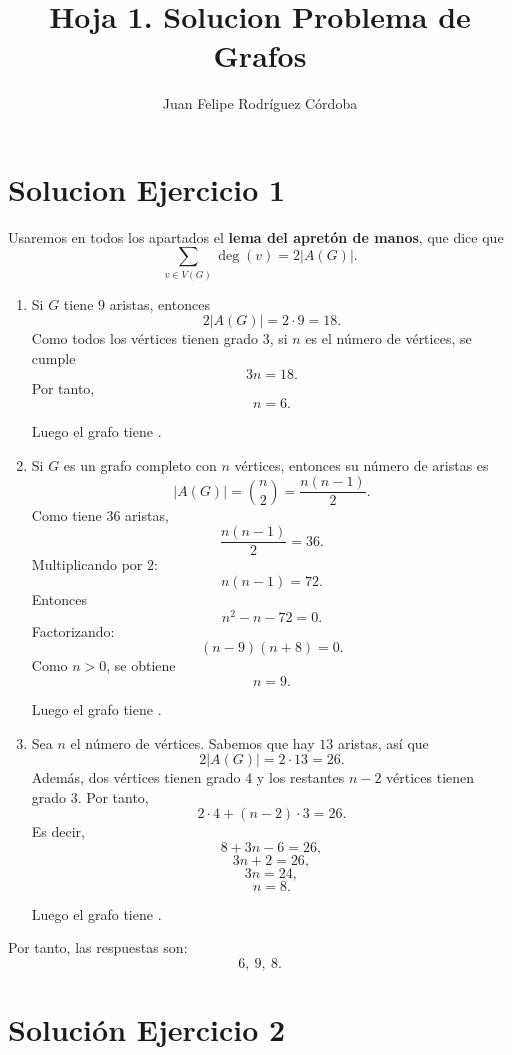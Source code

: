 \documentclass[12pt]{article}
\title{Hoja 1. Solucion Problema de Grafos}
\author{Juan Felipe Rodríguez Córdoba}
\date{}
\begin{document}
\maketitle
\section*{Solucion Ejercicio 1}
Usaremos en todos los apartados el \textbf{lema del apretón de manos}, que dice que
\[
\sum_{v \in V(G)} \deg(v)=2|A(G)|.
\]

\begin{enumerate}
    \item Si $G$ tiene $9$ aristas, entonces
    \[
    2|A(G)|=2\cdot 9=18.
    \]
    Como todos los vértices tienen grado $3$, si $n$ es el número de vértices, se cumple
    \[
    3n=18.
    \]
    Por tanto,
    \[
    n=6.
    \]

    Luego el grafo tiene .

    \item Si $G$ es un grafo completo con $n$ vértices, entonces su número de aristas es
    \[
    |A(G)|=\binom{n}{2}=\frac{n(n-1)}{2}.
    \]
    Como tiene $36$ aristas,
    \[
    \frac{n(n-1)}{2}=36.
    \]
    Multiplicando por $2$:
    \[
    n(n-1)=72.
    \]
    Entonces
    \[
    n^2-n-72=0.
    \]
    Factorizando:
    \[
    (n-9)(n+8)=0.
    \]
    Como $n>0$, se obtiene
    \[
    n=9.
    \]

    Luego el grafo tiene .

    \item Sea $n$ el número de vértices. Sabemos que hay $13$ aristas, así que
    \[
    2|A(G)|=2\cdot 13=26.
    \]
    Además, dos vértices tienen grado $4$ y los restantes $n-2$ vértices tienen grado $3$. Por tanto,
    \[
    2\cdot 4+(n-2)\cdot 3=26.
    \]
    Es decir,
    \[
    8+3n-6=26,
    \]
    \[
    3n+2=26,
    \]
    \[
    3n=24,
    \]
    \[
    n=8.
    \]

    Luego el grafo tiene .
\end{enumerate}

Por tanto, las respuestas son:
\[
\boxed{6,\ 9,\ 8.}
\]

\section*{Solución Ejercicio 2}
\end{document}
